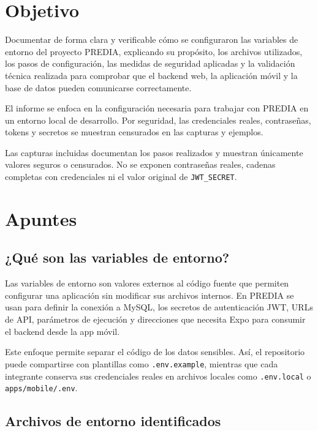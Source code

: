 \documentclass[12pt,a4paper]{article}
\begin{document}
\section{Objetivo}

Documentar de forma clara y verificable cómo se configuraron las variables de entorno del proyecto PREDIA, explicando su propósito, los archivos utilizados, los pasos de configuración, las medidas de seguridad aplicadas y la validación técnica realizada para comprobar que el backend web, la aplicación móvil y la base de datos pueden comunicarse correctamente.

El informe se enfoca en la configuración necesaria para trabajar con PREDIA en un entorno local de desarrollo. Por seguridad, las credenciales reales, contraseñas, tokens y secretos se muestran censurados en las capturas y ejemplos.

\begin{tcolorbox}[colback=prediaLight,colframe=prediaBorder,arc=2mm,boxrule=0.6pt,title={Nota de seguridad}]
Las capturas incluidas documentan los pasos realizados y muestran únicamente valores seguros o censurados. No se exponen contraseñas reales, cadenas completas con credenciales ni el valor original de \texttt{JWT\_SECRET}.
\end{tcolorbox}

\section{Apuntes}

\subsection{¿Qué son las variables de entorno?}

Las variables de entorno son valores externos al código fuente que permiten configurar una aplicación sin modificar sus archivos internos. En PREDIA se usan para definir la conexión a MySQL, los secretos de autenticación JWT, URLs de API, parámetros de ejecución y direcciones que necesita Expo para consumir el backend desde la app móvil.

Este enfoque permite separar el código de los datos sensibles. Así, el repositorio puede compartirse con plantillas como \texttt{.env.example}, mientras que cada integrante conserva sus credenciales reales en archivos locales como \texttt{.env.local} o \texttt{apps/mobile/.env}.

\subsection{Archivos de entorno identificados}
\end{document}
